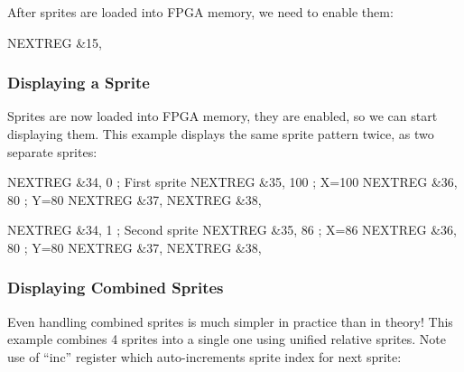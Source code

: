 After sprites are loaded into FPGA memory, we need to enable them:

\begin{tcblisting}{}
    NEXTREG &15, %
\end{tcblisting}


\subsubsection{Displaying a Sprite}

Sprites are now loaded into FPGA memory, they are enabled, so we can start displaying them. This example displays the same sprite pattern twice, as two separate sprites:

\begin{tcblisting}{}
    NEXTREG &34, 0              ; First sprite
    NEXTREG &35, 100            ; X=100
    NEXTREG &36, 80             ; Y=80
    NEXTREG &37, %
    NEXTREG &38, %

    NEXTREG &34, 1              ; Second sprite
    NEXTREG &35, 86             ; X=86
    NEXTREG &36, 80             ; Y=80
    NEXTREG &37, %
    NEXTREG &38, %
\end{tcblisting}


\pagebreak
\subsubsection{Displaying Combined Sprites}

Even handling combined sprites is much simpler in practice than in theory! This example combines 4 sprites into a single one using unified relative sprites. Note use of ``inc'' register  which auto-increments sprite index for next sprite:

